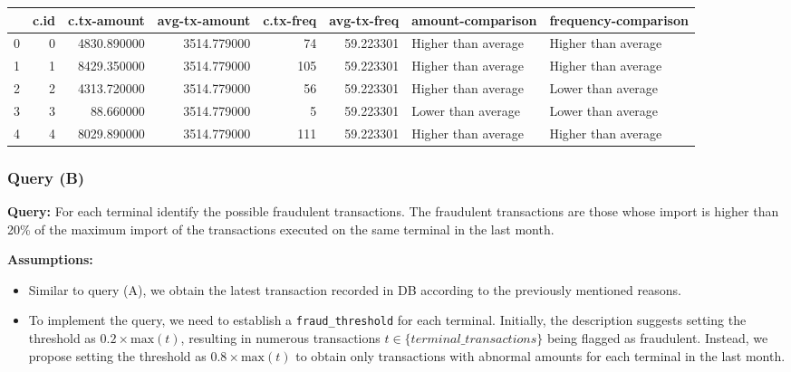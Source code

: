             
    
    \begin{center}
\begin{tabular}{lrrrrrll}
\toprule
 & c.id & c.tx-amount & avg-tx-amount & c.tx-freq & avg-tx-freq & amount-comparison & frequency-comparison \\
\midrule
0 & 0 & 4830.890000 & 3514.779000 & 74 & 59.223301 & Higher than average & Higher than average \\
1 & 1 & 8429.350000 & 3514.779000 & 105 & 59.223301 & Higher than average & Higher than average \\
2 & 2 & 4313.720000 & 3514.779000 & 56 & 59.223301 & Higher than average & Lower than average \\
3 & 3 & 88.660000 & 3514.779000 & 5 & 59.223301 & Lower than average & Lower than average \\
4 & 4 & 8029.890000 & 3514.779000 & 111 & 59.223301 & Higher than average & Higher than average \\
\bottomrule
\end{tabular}

\end{center}

    

    \hypertarget{query-b}{%
\subsubsection{Query (B)}\label{query-b}}

    \textbf{Query:} For each terminal identify the possible fraudulent
transactions. The fraudulent transactions are those whose import is
higher than 20\% of the maximum import of the transactions executed on
the same terminal in the last month.

\textbf{Assumptions:}

\begin{itemize}
\tightlist
\item
  Similar to query (A), we obtain the latest transaction recorded in DB
  according to the previously mentioned reasons.
\item
  To implement the query, we need to establish a
  \texttt{fraud\_threshold} for each terminal. Initially, the
  description suggests setting the threshold as
  \(0.2 \times \text{max}(t)\), resulting in numerous transactions
  \(t \in \{terminal\_transactions\}\) being flagged as fraudulent.
  Instead, we propose setting the threshold as
  \(0.8 \times \text{max}(t)\) to obtain only transactions with abnormal
  amounts for each terminal in the last month.
\end{itemize}

